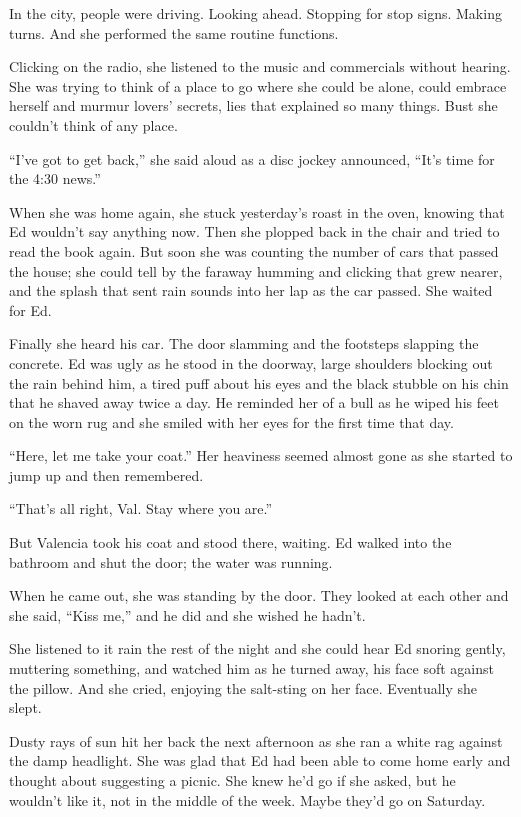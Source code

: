 \documentclass[
]{article}
\begin{document}
In the city, people were driving. Looking ahead. Stopping for stop
signs. Making turns. And she performed the same routine functions.

Clicking on the radio, she listened to the music and commercials without
hearing. She was trying to think of a place to go where she could be
alone, could embrace herself and murmur lovers' secrets, lies that
explained so many things. Bust she couldn't think of any place.

``I've got to get back,'' she said aloud as a disc jockey announced,
``It's time for the 4:30 news.''

When she was home again, she stuck yesterday's roast in the oven,
knowing that Ed wouldn't say anything now. Then she plopped back in the
chair and tried to read the book again. But soon she was counting the
number of cars that passed the house; she could tell by the faraway
humming and clicking that grew nearer, and the splash that sent rain
sounds into her lap as the car passed. She waited for Ed.

Finally she heard his car. The door slamming and the footsteps slapping
the concrete. Ed was ugly as he stood in the doorway, large shoulders
blocking out the rain behind him, a tired puff about his eyes and the
black stubble on his chin that he shaved away twice a day. He reminded
her of a bull as he wiped his feet on the worn rug and she smiled with
her eyes for the first time that day.

``Here, let me take your coat.'' Her heaviness seemed almost gone as she
started to jump up and then remembered.

``That's all right, Val. Stay where you are.''

But Valencia took his coat and stood there, waiting. Ed walked into the
bathroom and shut the door; the water was running.

When he came out, she was standing by the door. They looked at each
other and she said, ``Kiss me,'' and he did and she wished he hadn't.

She listened to it rain the rest of the night and she could hear Ed
snoring gently, muttering something, and watched him as he turned away,
his face soft against the pillow. And she cried, enjoy­ing the
salt-sting on her face. Eventually she slept.

Dusty rays of sun hit her back the next afternoon as she ran a white rag
against the damp head­light. She was glad that Ed had been able to come
home early and thought about suggesting a picnic. She knew he'd go if
she asked, but he wouldn't like it, not in the middle of the week. Maybe
they'd go on Saturday.
\end{document}
